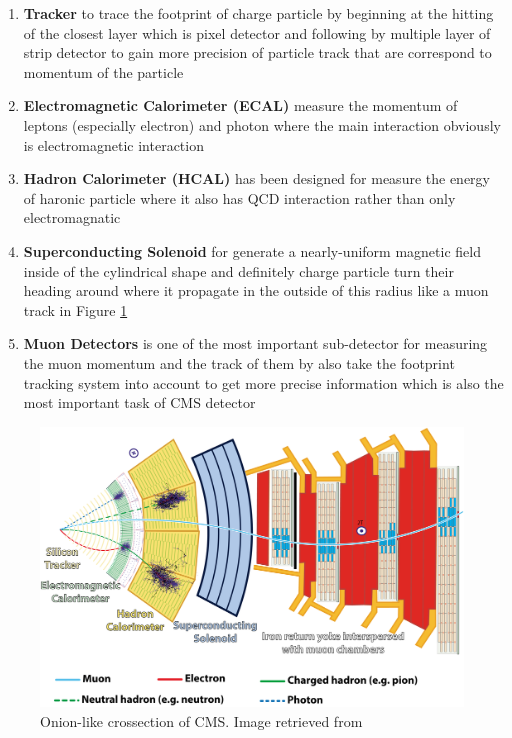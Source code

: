 \begin{enumerate}
    \item \textbf{Tracker} to trace the footprint of charge particle by beginning at the hitting of the closest layer which is pixel detector and following by multiple layer of strip detector to gain more precision of particle track that are correspond to momentum of the particle
    \item \textbf{Electromagnetic Calorimeter (ECAL)} measure the momentum of leptons (especially electron) and photon where the main interaction obviously is electromagnetic interaction
    \item \textbf{Hadron Calorimeter (HCAL)} has been designed for measure the energy of haronic particle where it also has QCD interaction rather than only electromagnatic
    \item \textbf{Superconducting Solenoid} for generate a nearly-uniform magnetic field inside of the cylindrical shape and definitely charge particle turn their heading around where it propagate in the outside of this radius like a muon track in Figure \ref{fig:cms_slide}
    \item \textbf{Muon Detectors} is one of the most important sub-detector for measuring the muon momentum and the track of them by also take the footprint tracking system into account to get more precise information which is also the most important task of CMS detector
\end{enumerate}
\begin{figure}[h!]
    \includegraphics[width=\textwidth]{images/cms_slide.png}
    \caption{Onion-like crossection of CMS. Image retrieved from \cite{cms_onion}}
    \label{fig:cms_slide}
\end{figure}


